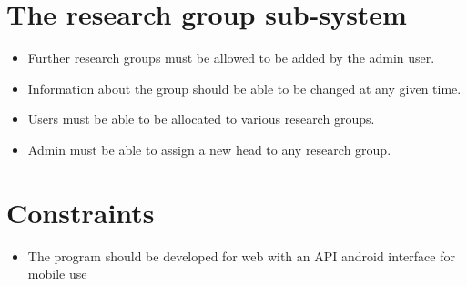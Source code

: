 \documentclass[a4paper]{article}
\begin{document}
\section{The research group sub-system}
	\begin{itemize}
		\item Further research groups must be allowed to be added by the admin user.
        \item Information about the group should be able to be changed at any given time.
        \item Users must be able to be allocated to various research groups.
        \item Admin must be able to assign a new head to any research group.
	\end{itemize}
    
\section{Constraints}
	\begin{itemize}
		\item The program should be developed for web with an API android interface for mobile use
	\end{itemize}
 
\end{document}
